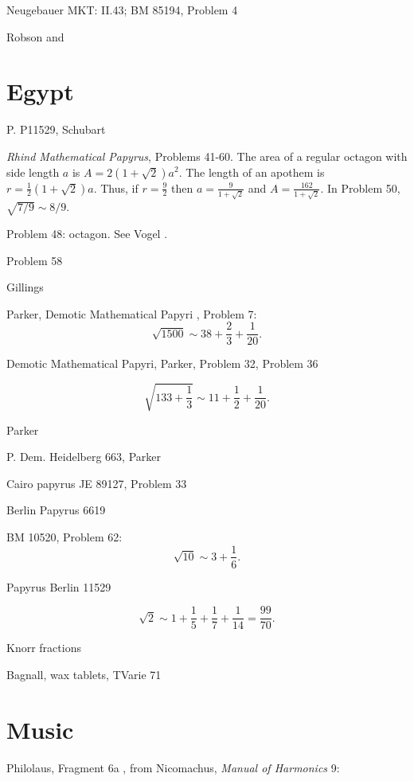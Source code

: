 \documentclass{article}
\theoremstyle{definition}
\begin{document}
Neugebauer \cite{MKT} MKT: II.43; BM 85194, Problem 4

Robson \cite{robson} and \cite{robson1999}







\section{Egypt}
P. P11529, Schubart \cite{P11529}

{\em Rhind Mathematical Papyrus}, Problems 41-60. The area of a regular octagon with side length $a$ is 
$A=2(1+\sqrt{2})a^2$. The length of an apothem is $r=\frac{1}{2}(1+\sqrt{2})a$. 
Thus, if $r=\frac{9}{2}$ then $a=\frac{9}{1+\sqrt{2}}$ and $A=\frac{162}{1+\sqrt{2}}$. In Problem 50, $\sqrt{7/9} \sim 8/9$.

Problem 48: octagon. See Vogel \cite[p.~66]{vogel}.

Problem 58 \cite[p.~167]{egyptian3}

Gillings \cite{gillings}

Parker, Demotic Mathematical Papyri \cite{DMP}, Problem 7:
\[
\sqrt{1500} \sim 38+\frac{2}{3}+\frac{1}{20}.
\]

Demotic Mathematical Papyri, Parker, Problem 32, Problem 36

\[
\sqrt{133+\frac{1}{3}} \sim 11+\frac{1}{2}+\frac{1}{20}.
\]

Parker \cite{parker1969}

P. Dem. Heidelberg 663, Parker \cite{Heidelberg663}

Cairo papyrus JE 89127, Problem 33

Berlin Papyrus 6619

BM 10520, Problem 62:
\[
\sqrt{10} \sim 3+\frac{1}{6}.
\]

Papyrus Berlin 11529

\[
\sqrt{2} \sim 1 + \frac{1}{5}+\frac{1}{7}+\frac{1}{14} = \frac{99}{70}.
\]

Knorr \cite{knorr1982} fractions

Bagnall, wax tablets, TVarie 71 \cite{bagnall}






\section{Music}
Philolaus, Fragment 6a  \cite[pp.~146--147]{philolaus},  from Nicomachus, {\em Manual of Harmonics} 9:
\end{document}
